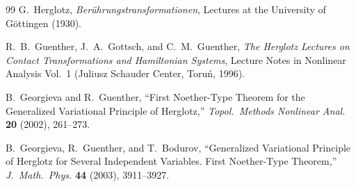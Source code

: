 \documentclass[12pt]{book}
\theoremstyle{definition}
\theoremstyle{remark}
\begin{document}
\begin{thebibliography}{99}
 G.\ Herglotz, \emph{Ber\"uhrungstransformationen}, Lectures at the University of G\"ottingen (1930).

 R.\ B.\ Guenther, J.\ A.\ Gottsch, and C.\ M.\ Guenther, \emph{The Herglotz Lectures on Contact Transformations and Hamiltonian Systems}, Lecture Notes in Nonlinear Analysis Vol.\ 1 (Juliusz Schauder Center, Toru\'n, 1996).

 B.\ Georgieva and R.\ Guenther, ``First Noether-Type Theorem for the Generalized Variational Principle of Herglotz,'' \emph{Topol.\ Methods Nonlinear Anal.} \textbf{20} (2002), 261--273.

 B.\ Georgieva, R.\ Guenther, and T.\ Bodurov, ``Generalized Variational Principle of Herglotz for Several Independent Variables. First Noether-Type Theorem,'' \emph{J.\ Math.\ Phys.} \textbf{44} (2003), 3911--3927.

\end{thebibliography}
\end{document}
